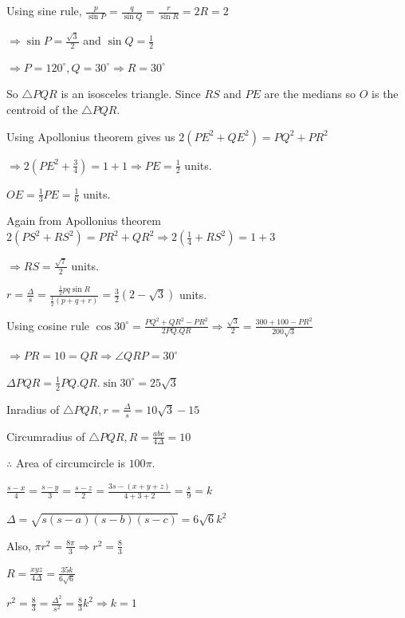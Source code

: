   \startplacefigure
    \externalfigure[17_23.pdf]
  \stopplacefigure

  Using sine rule, $\frac{p}{\sin P} = \frac{q}{\sin Q} = \frac{r}{\sin R} = 2R = 2$

  $\Rightarrow \sin P = \frac{\sqrt{3}}{2}$ and $\sin Q = \frac{1}{2}$

  $\Rightarrow P = 120^\circ, Q = 30^\circ\Rightarrow R = 30^\circ$

  So $\triangle PQR$ is an isosceles triangle. Since $RS$ and $PE$ are the medians so $O$ is the centroid of
  the $\triangle PQR$.

  Using Apollonius theorem gives us $2\left(PE^2 + QE^2\right) = PQ^2 + PR^2$

  $\Rightarrow 2\left(PE^2 + \frac{3}{4}\right) = 1 + 1 \Rightarrow PE = \frac{1}{2}$ units.

  $OE = \frac{1}{3}PE = \frac{1}{6}$ units.

  Again from Apollonius theorem $2\left(PS^2 + RS^2\right) = PR^2 + QR^2\Rightarrow 2\left(\frac{1}{4} +
  RS^2\right) = 1 + 3$

  $\Rightarrow RS = \frac{\sqrt{7}}{2}$ units.

  $r = \frac{\Delta}{s} = \frac{\frac{1}{2}pq\sin R}{\frac{1}{2}(p + q + r)} = \frac{3}{2}\left(2
  - \sqrt{3}\right)$ units.
\item Using cosine rule $\cos30^\circ = \frac{PQ^2 + QR^2 - PR^2}{2PQ.QR} \Rightarrow \frac{\sqrt{3}}{2}
  = \frac{300 + 100 - PR^2}{200\sqrt{3}}$

  $\Rightarrow PR = 10 = QR \Rightarrow \angle QRP = 30^\circ$

  $\Delta PQR = \frac{1}{2}PQ.QR.\sin30^\circ = 25\sqrt{3}$

  Inradius of $\triangle PQR, r = \frac{\Delta}{s} = 10\sqrt{3}- 15$

  Circumradius of $\triangle PQR, R = \frac{abc}{4\Delta} = 10$

  $\therefore $ Area of circumcircle is $100\pi$.
\item $\frac{s - x}{4} = \frac{s - y}{3} = \frac{s - z}{2} = \frac{3s - (x + y + z)}{4 + 3 + 2}
  = \frac{s}{9} = k$

  $\Delta = \sqrt{s(s - a)(s - b)(s - c)} = 6\sqrt{6}k^2$

  Also, $\pi r^2 = \frac{8\pi}{3}\Rightarrow r^2 = \frac{8}{3}$

  $R = \frac{xyz}{4\Delta} = \frac{35k}{6\sqrt{6}}$

  $r^2 = \frac{8}{3} = \frac{\Delta^2}{s^2} = \frac{8}{3}k^2 \Rightarrow k = 1$

